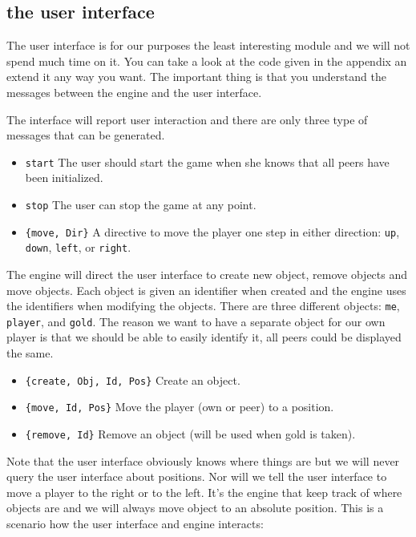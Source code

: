 \documentclass[a4paper,11pt]{article}
\begin{document}
\subsection{the user interface}

The user interface is for our purposes the least interesting module
and we will not spend much time on it. You can take a look at the code
given in the appendix an extend it any way you want. The important
thing is that you understand the messages between the engine and the
user interface.

The interface will report user interaction and there are only three type of messages
that can be generated.

\begin{itemize}
\item {\tt start} The user should start the game when she knows that all peers have been initialized.
\item {\tt stop} The user can stop the game at any point.
\item {\tt \{move, Dir\}} A directive to move the player one step in either direction: {\tt up}, {\tt down}, {\tt left}, or {\tt right}.
\end{itemize}

The engine will direct the user interface to create new object, remove objects
and move objects. Each object is given an identifier when created and
the engine uses the identifiers when modifying the objects.  There are
three different objects: {\tt me}, {\tt player}, and {\tt gold}. The
reason we want to have a separate object for our own player is that we
should be able to easily identify it, all peers could be displayed the same.

\begin{itemize}
\item {\tt \{create, Obj, Id, Pos\}} Create an object.
\item {\tt \{move, Id, Pos\}} Move the player (own or peer) to a position.
\item {\tt \{remove, Id\}} Remove an object (will be used when gold is taken).
\end{itemize}

Note that the user interface obviously knows where things are but we
will never query the user interface about positions. Nor will we tell
the user interface to move a player to the right or to the left. It's
the engine that keep track of where objects are and we will always
move object to an absolute position. This is a scenario how the user
interface and engine interacts:
\end{document}
